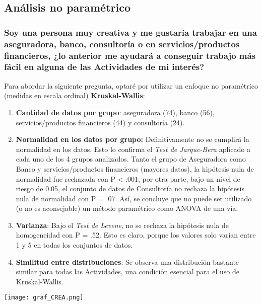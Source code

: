 \documentclass{article}
\begin{document}
\subsection{Análisis no paramétrico}

\subsubsection{Soy una persona muy creativa y me gustaría trabajar en una aseguradora, banco, consultoría o en servicios/productos financieros, ¿lo anterior me ayudará a conseguir trabajo más fácil en alguna de las Actividades de mi interés?}

Para abordar la siguiente pregunta, optaré por utilizar un enfoque no paramétrico (medidas en escala ordinal) \textbf{Kruskal-Wallis}:

\begin{enumerate}
    
    \item \textbf{Cantidad de datos por grupo}: aseguradora (74), banco (56), servicios/productos financieros (44) y consultoría (24). 
    
    \item \textbf{Normalidad en los datos por grupo:} Definitivamente no se cumplirá la normalidad en los datos. Esto lo confirma el \textit{Test de Jarque-Bera} aplicado a cada uno de los 4 grupos analizados. Tanto el grupo de Aseguradora como Banco y servicios/productos financieros  (mayores datos), la hipótesis nula de normalidad fue rechazada con P < .001; por otra parte, bajo un nivel de riesgo de 0.05, el conjunto de datos de Consultoría no rechaza la hipótesis nula de normalidad con P = .07. Así, se concluye que no puede ser utilizado (o no es aconsejable) un método paramétrico como ANOVA de una vía. 
    
    \item \textbf{Varianza}: Bajo el \textit{Test de Levene}, no se rechaza la hipótesis nula de homogeneidad con P = .52. Esto es claro, porque los valores solo varían entre 1 y 5 en todas los conjuntos de datos.
    
    \item \textbf{Similitud entre distribuciones}: Se observa una distribución bastante similar para todas las Actividades, una condición esencial para el uso de Kruskal-Wallis. 
\end{enumerate}

\begin{center}
    \texttt{[image: graf\_CREA.png]}
\end{center}
\end{document}
